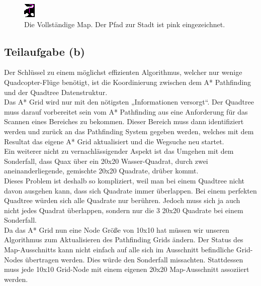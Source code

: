 \documentclass[a4paper,12pt]{article}
\begin{document}
\begin{figure}[H]
\centering
    \includegraphics[width=.5\linewidth]{Bilder/Aufgabe3/Teilaufgabe_A/Beispiel_04.png}
    \caption{Die Vollständige Map. Der Pfad zur Stadt ist pink eingezeichnet.}
\end{figure}

\subsection{Teilaufgabe (b)}
Der Schlüssel zu einem möglichst effizienten Algorithmus, welcher nur wenige Quadcopter-Flüge benötigt, ist die Koordinierung zwischen dem A* Pathfinding und der Quadtree Datenstruktur.
\\[0.4cm]
Das A* Grid wird nur mit den nötigsten „Informationen versorgt“.
Der Quadtree muss darauf vorbereitet sein vom A* Pathfinding aus eine Anforderung für das Scannen eines Bereiches zu bekommen. Dieser Bereich muss dann identifiziert werden und zurück an das Pathfinding System gegeben werden, welches mit dem Resultat das eigene A* Grid aktualisiert und die Wegsuche neu startet.
\\[0.4cm]
Ein weiterer nicht zu vernachlässigender Aspekt ist das Umgehen mit dem Sonderfall, dass Quax über ein 20x20 Wasser-Quadrat, durch zwei aneinanderliegende, gemischte 20x20 Quadrate, drüber kommt.
\\[0.4cm]
Dieses Problem ist deshalb so kompliziert, weil man bei einem Quadtree nicht davon ausgehen kann, dass sich Quadrate immer überlappen. Bei einem perfekten Quadtree würden sich alle Quadrate nur berühren. Jedoch muss sich ja auch nicht jedes Quadrat überlappen, sondern nur die 3 20x20 Quadrate bei einem Sonderfall.
\\[0.4cm]
Da das A* Grid nun eine Node Größe von 10x10 hat müssen wir unseren Algorithmus zum Aktualisieren des Pathfinding Grids ändern. Der Status des Map-Ausschnitts kann nicht einfach auf alle sich im Ausschnitt befindliche Grid-Nodes übertragen werden. Dies würde den Sonderfall missachten. Stattdessen muss jede 10x10 Grid-Node mit einem eigenen 20x20 Map-Ausschnitt assoziiert werden. 
\end{document}
